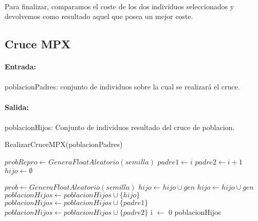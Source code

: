 	\paragraph{}Para finalizar, comparamos el coste de los dos individuos seleccionados y devolvemos como resultado aquel que posea un mejor coste.
	
	\subsection{Cruce MPX}
	
	\paragraph{Entrada:}
	
	\paragraph{}poblacionPadres: conjunto de individuos sobre la cual se realizará el cruce.
	
	\paragraph{Salida:}
	
	\paragraph{}poblacionHijos: Conjunto de individuos resultado del cruce de poblacion.

	\begin{algorithm}[H]
		\caption{RealizarCruceMPX(poblacionPadres)}
		\begin{algorithmic}
				\STATE $probRepro \leftarrow GeneraFloatAleatorio(semilla)$
				\STATE $padre1 \leftarrow i$
				\STATE $padre2 \leftarrow i+1$
					\STATE $hijo \leftarrow \emptyset $
					
						\STATE $prob \leftarrow GeneraFloatAleatorio(semilla)$
							\STATE $hijo \leftarrow hijo\cup gen$
						\ENDIF
					\ENDFOR
						\STATE $hijo \leftarrow hijo\cup gen$
					\ENDFOR
					\STATE $poblacionHijos \leftarrow poblacionHijos\cup\{hijo\}$
				\ELSE
					\STATE $poblacionHijos \leftarrow poblacionHijos\cup\{padre1\}$
						\STATE $poblacionHijos \leftarrow poblacionHijos\cup\{padre2\}$
					\ENDIF
				\ENDIF
					\STATE i $\leftarrow$ 0
				\ENDIF
			\ENDFOR
			\RETURN poblacionHijos
		\end{algorithmic}
	\end{algorithm}

